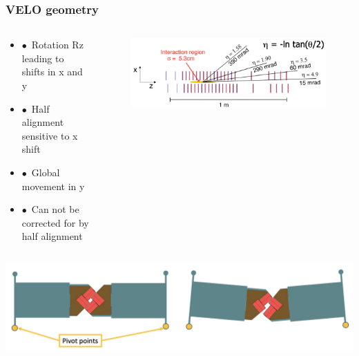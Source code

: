 \documentclass[aspectratio=1610, 12pt, xcolor=dvipsnames]{beamer}
\begin{document}
\begin{frame}\frametitle{VELO geometry}
  \begin{columns}
    \begin{column}[c]{0.5\textwidth}
      \begin{itemize}
        \item $\bullet$\, Rotation Rz leading to shifts in x and y
        \item $\bullet$\, Half alignment sensitive to x shift
        \item $\bullet$\, Global movement in y
        \item $\bullet$\, Can not be corrected for by half alignment
      \end{itemize}    
    \end{column}
    \begin{column}[c]{0.5\textwidth}
      \begin{figure}
        \centering
        \includegraphics[width=\textwidth]{plots/velo_layers_all.png}
      \end{figure}
    \end{column}
  \end{columns}
  \includegraphics[width=\textwidth]{plots/velo_rotation.png}
\end{frame}
\end{document}
